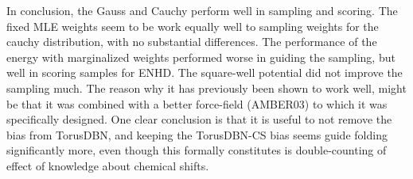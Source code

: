 In conclusion, the Gauss and Cauchy perform well in sampling and scoring.
The fixed MLE weights seem to be work equally well to sampling weights for the cauchy distribution, with no substantial differences.
The performance of the energy with marginalized weights performed worse in guiding the sampling, but well in scoring samples for ENHD.
The square-well potential did not improve the sampling much.
The reason why it has previously been shown to work well, might be that it was combined with a better force-field (AMBER03) to which it was specifically designed.
One clear conclusion is that it is useful to not remove the bias from TorusDBN, and keeping the TorusDBN-CS bias seems guide folding significantly more, even though this formally constitutes is double-counting of effect of knowledge about chemical shifts.




